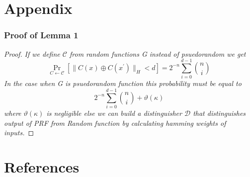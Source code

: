 \documentclass[hyperref={pdfpagelabels=false}]{beamer}
\theoremstyle{remark}
\begin{document}
\section{Appendix}
\begin{frame}
\frametitle{Proof of Lemma 1}
\begin{proof}
\textit{If we define $\mathcal{C}$ from random functions G instead of psuedorandom we get
\begin{equation*}
\Pr_{C\leftarrow \mathcal{C}} \left[ \|C(x) \oplus C(x^\prime)\|_H < d \right] = 2^{-n}\sum_{i=0}^{d-1} {n \choose i}
\end{equation*}
In the case when G is psuedorandom function this probability must be equal to
\begin{equation*}
2^{-n}\sum_{i=0}^{d-1} {n \choose i} + \vartheta(\kappa)
\end{equation*}
where $\vartheta(\kappa)$ is negligible
else we can build a distinguisher $\mathcal{D}$ that distinguishes output of PRF from Random function by calculating hamming weights of inputs.}
\end{proof}
\end{frame}
\section{References}


\end{document}
